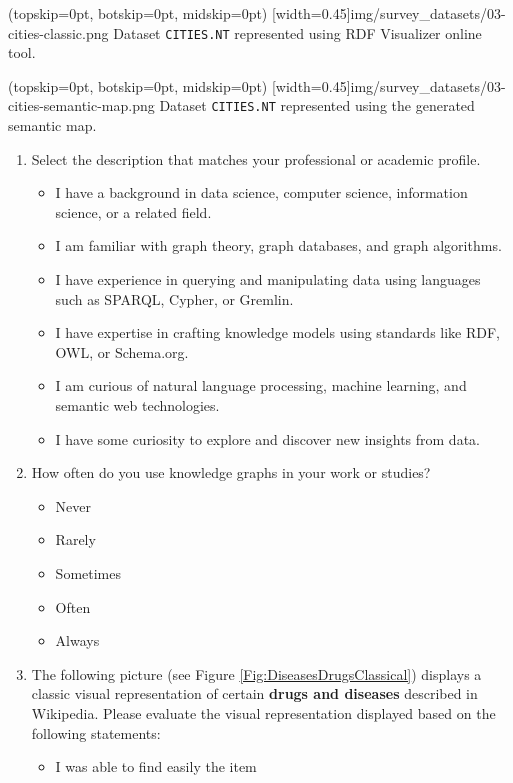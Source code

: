 \documentclass{ieeeaccess}
\begin{document}
\Figure[h!](topskip=0pt, botskip=0pt, midskip=0pt)
[width=0.45\textwidth]{img/survey_datasets/03-cities-classic.png}
{Dataset \texttt{CITIES.NT} represented using RDF Visualizer online tool. \label{Fig:CitiesClassical}}

\Figure[h!](topskip=0pt, botskip=0pt, midskip=0pt)
[width=0.45\textwidth]{img/survey_datasets/03-cities-semantic-map.png}
{Dataset \texttt{CITIES.NT} represented using the generated semantic map. \label{Fig:CitiesSemMap}}

\begin{enumerate}
    \item Select the description that matches your professional or academic profile.
    \begin{itemize}
        \item I have a background in data science, computer science, information science, or a related field.
        \item I am familiar with graph theory, graph databases, and graph algorithms.
        \item I have experience in querying and manipulating data using languages such as SPARQL, Cypher, or Gremlin.
        \item I have expertise in crafting knowledge models using standards like RDF, OWL, or Schema.org.
        \item I am curious of natural language processing, machine learning, and semantic web technologies.
        \item I have some curiosity to explore and discover new insights from data.
    \end{itemize}
    \item How often do you use knowledge graphs in your work or studies?
    \begin{itemize}
        \item Never
        \item Rarely
        \item Sometimes
        \item Often
        \item Always
    \end{itemize}
    \item The following picture (see Figure \ref{Fig:DiseasesDrugsClassical}) displays a classic visual representation of certain \textbf{drugs and diseases} described in Wikipedia. Please evaluate the visual representation displayed based on the following statements:
    \begin{itemize}
        \item I was able to find easily the item
        

\end{itemize}
\end{enumerate}
\end{document}
